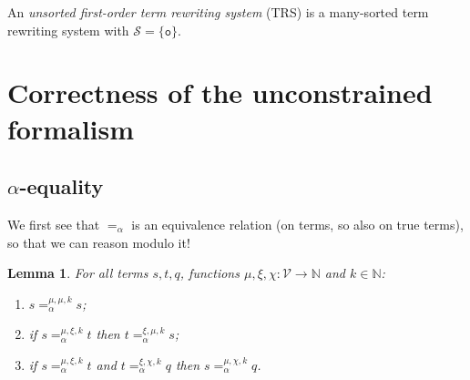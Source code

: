 \documentclass{lmcs}
\theoremstyle{theorem}\newtheorem{theorem}{Theorem}
\theoremstyle{theorem}\newtheorem{lemma}[theorem]{Lemma}
\theoremstyle{theorem}\newtheorem{corollary}[theorem]{Corollary}
\theoremstyle{definition}\newtheorem{definition}[theorem]{Definition}
\theoremstyle{definition}\newtheorem{example}[theorem]{Example}
\newcommand{\N}{\mathbb{N}}
\newcommand{\V}{\mathcal{V}}
\newcommand{\Sorts}{\mathcal{S}}
\newcommand{\unitsort}{\mathtt{o}}
\begin{document}
An \emph{unsorted first-order term rewriting system} (TRS) is a many-sorted term rewriting system
with $\Sorts = \{ \unitsort \}$.

\newpage\appendix

\newcommand{\hideproof}[1]{[Details hidden]}
\newcommand{\showproof}[1]{\ \\\textbf{(details:)}\\#1}

\section{Correctness of the unconstrained formalism}

\subsection{$\alpha$-equality}

We first see that $=_\alpha$ is an equivalence relation (on terms, so also on true terms), so that
we can reason modulo it!

\begin{lemma}\label{lem:alphaequiv}
For all terms $s,t,q$, functions $\mu,\xi,\chi : \V \to \N$ and $k \in \N$:
\begin{enumerate}
\item\label{lem:alphaequiv:reflexive}
  $s =_\alpha^{\mu,\mu,k} s$;
\item\label{lem:alphaequiv:symmetric}
  if $s =_\alpha^{\mu,\xi,k} t$ then $t =_\alpha^{\xi,\mu,k} s$;
\item\label{lem:alphaequiv:transitive}
  if $s =_\alpha^{\mu,\xi,k} t$ and $t =_\alpha^{\xi,\chi,k} q$ then $s =_\alpha^{\mu,\chi,k} q$.
\end{enumerate}
\end{lemma}
\end{document}
